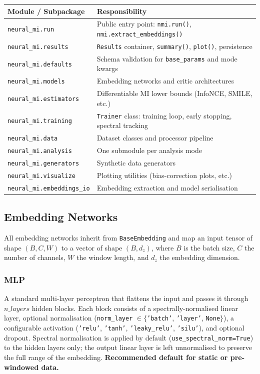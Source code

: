 \documentclass[12pt]{article}
\newcommand{\api}[1]{\texttt{#1}}
\begin{document}
\begin{center}
\begin{tabular}{lp{10cm}}
\toprule
\textbf{Module / Subpackage} & \textbf{Responsibility} \\
\midrule
\api{neural\_mi.run} & Public entry point: \api{nmi.run()}, \api{nmi.extract\_embeddings()} \\
\api{neural\_mi.results} & \api{Results} container, \api{summary()}, \api{plot()}, persistence \\
\api{neural\_mi.defaults} & Schema validation for \api{base\_params} and mode kwargs \\
\api{neural\_mi.models} & Embedding networks and critic architectures \\
\api{neural\_mi.estimators} & Differentiable MI lower bounds (InfoNCE, SMILE, etc.) \\
\api{neural\_mi.training} & \api{Trainer} class: training loop, early stopping, spectral tracking \\
\api{neural\_mi.data} & Dataset classes and processor pipeline \\
\api{neural\_mi.analysis} & One submodule per analysis mode \\
\api{neural\_mi.generators} & Synthetic data generators \\
\api{neural\_mi.visualize} & Plotting utilities (bias-correction plots, etc.) \\
\api{neural\_mi.embeddings\_io} & Embedding extraction and model serialisation \\
\bottomrule
\end{tabular}
\end{center}

\subsection{Embedding Networks}
\label{sec:arch:embeddings}

All embedding networks inherit from \api{BaseEmbedding} and map an input
tensor of shape $(B,C,W)$ to a vector of shape $(B,d_z)$, where $B$ is
the batch size, $C$ the number of channels, $W$ the window length, and
$d_z$ the embedding dimension.

\subsubsection{MLP}
A standard multi-layer perceptron that flattens the input and passes it
through $n\_layers$ hidden blocks.  Each block consists of a
spectrally-normalised linear layer, optional normalisation
(\api{norm\_layer} $\in \{$\api{'batch'}, \api{'layer'}, \api{None}$\}$),
a configurable activation
(\api{'relu'}, \api{'tanh'}, \api{'leaky\_relu'}, \api{'silu'}),
and optional dropout.  Spectral normalisation is applied by default
(\api{use\_spectral\_norm=True}) to the hidden layers only; the output
linear layer is left unnormalised to preserve the full range of the
embedding.  \textbf{Recommended default for static or pre-windowed data.}
\end{document}
